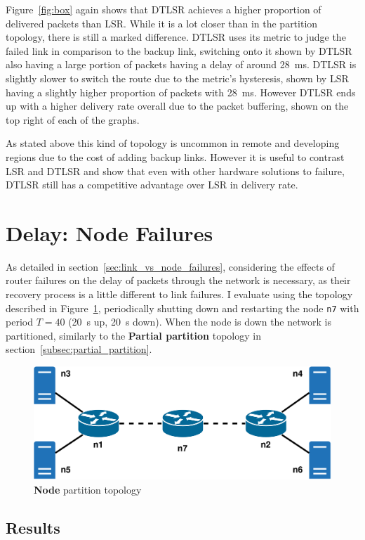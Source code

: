 \documentclass[withindex,glossary,openany]{cam-thesis}
\begin{document}
Figure~\ref{fig:box} again shows that DTLSR achieves a higher proportion of delivered packets than LSR. While it is a lot closer than in the partition topology, there is still a marked difference. DTLSR uses its metric to judge the failed link in comparison to the backup link, switching onto it shown by DTLSR also having a large portion of packets having a delay of around \SI{28}{\ms}. DTLSR is slightly slower to switch the route due to the metric's hysteresis, shown by LSR having a slightly higher proportion of packets with \SI{28}{\ms}. However DTLSR ends up with a higher delivery rate overall due to the packet buffering, shown on the top right of each of the graphs.

As stated above this kind of topology is uncommon in remote and developing regions due to the cost of adding backup links. However it is useful to contrast LSR and DTLSR and show that even with other hardware solutions to failure, DTLSR still has a competitive advantage over LSR in delivery rate.

\section{Delay: Node Failures}

As detailed in section~\ref{sec:link_vs_node_failures}, considering the effects of router failures on the delay of packets through the network is necessary, as their recovery process is a little different to link failures. I evaluate using the topology described in Figure~\ref{fig:node_partition_topology}, periodically shutting down and restarting the node \texttt{n7} with period $T=40$ (\SI{20}{\s} up, \SI{20}{\s} down). When the node is down the network is partitioned, similarly to the \textbf{Partial partition} topology in section~\ref{subsec:partial_partition}.

\begin{figure}[H]
  \centering
  \includegraphics[width=0.65\linewidth]{delay_full_partition_topology}
  \caption{\textbf{Node} partition topology}
  \label{fig:node_partition_topology}
\end{figure}

\subsection{Results}
\end{document}
